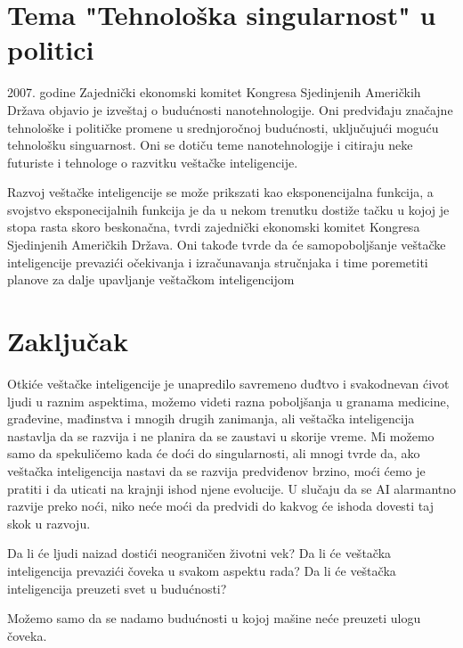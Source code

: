 \documentclass[a4paper]{article}
\begin{document}
\section{Tema "Tehnološka singularnost" u politici}
\label{sec:politika}
2007. godine Zajednički ekonomski komitet Kongresa Sjedinjenih Američkih Država objavio je izveštaj o budućnosti nanotehnologije. Oni predviđaju značajne tehnološke i političke promene u srednjoročnoj budućnosti, uključujući moguću tehnološku singuarnost. Oni se dotiču teme nanotehnologije i citiraju neke futuriste i tehnologe o razvitku veštačke inteligencije.


Razvoj veštačke inteligencije se može prikszati kao eksponencijalna funkcija, a svojstvo eksponecijalnih funkcija je da u nekom trenutku dostiže tačku u kojoj je stopa rasta skoro beskonačna, tvrdi zajednički ekonomski komitet Kongresa Sjedinjenih Američkih Država. Oni takođe tvrde da će samopoboljšanje veštačke inteligencije prevazići očekivanja i izračunavanja stručnjaka i time poremetiti planove za dalje upavljanje veštačkom inteligencijom
\cite{refe9}

\section{Zaključak}
\label{sec:zakljucak}
Otkiće veštačke inteligencije je unapredilo savremeno duđtvo i svakodnevan ćivot ljudi u raznim aspektima, možemo videti razna poboljšanja u granama medicine, građevine, mađinstva i mnogih drugih zanimanja, ali veštačka inteligencija nastavlja da se razvija i ne planira da se zaustavi u skorije vreme. Mi možemo samo da spekuličemo kada će doći do singularnosti, ali mnogi tvrde da, ako veštačka inteligencija nastavi da se razvija predviđenov brzino, moći ćemo je pratiti i da uticati na krajnji ishod njene evolucije. U slučaju da se AI alarmantno razvije preko noći, niko neće moći da predvidi do kakvog će ishoda dovesti taj skok u razvoju.

Da li će ljudi naizad dostići neograničen životni vek? Da li će veštačka inteligencija prevazići čoveka u svakom aspektu rada? Da li će veštačka inteligencija preuzeti svet u budućnosti?

Možemo samo da se nadamo budućnosti u kojoj mašine neće preuzeti ulogu čoveka.

\appendix

\end{document}
